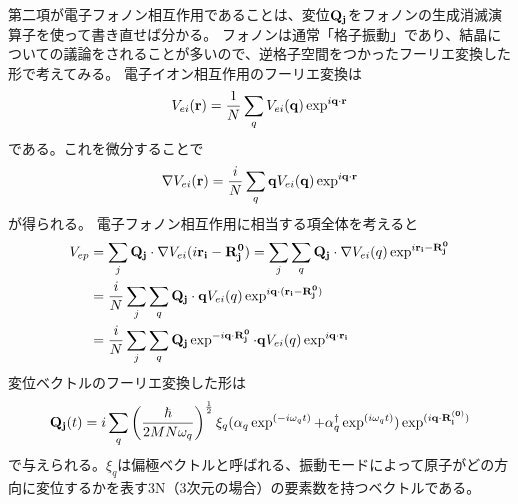 \documentclass[letterpaper,10pt,dvipdfmx]{sphinxhowto}
\begin{document}
第二項が電子フォノン相互作用であることは、変位\(\bf{Q_j}\)をフォノンの生成消滅演算子を使って書き直せば分かる。
フォノンは通常「格子振動」であり、結晶についての議論をされることが多いので、逆格子空間をつかったフーリエ変換した形で考えてみる。
電子イオン相互作用のフーリエ変換は
\begin{equation*}
\begin{split}\begin{aligned}
V_{ei} ({\bf r}) = \frac{1}{N} \sum_{q} V_{ei}({\bf q})\exp^{i{\bf q\cdot r}}\end{aligned}\end{split}
\end{equation*}
である。これを微分することで
\begin{equation*}
\begin{split}\begin{aligned}
\nabla V_{ei} ({\bf r}) = \frac{i}{N} \sum_{q} {\bf q} V_{ei}({\bf
q})\exp^{i{\bf q\cdot r}}\end{aligned}\end{split}
\end{equation*}
が得られる。 電子フォノン相互作用に相当する項全体を考えると
\begin{equation*}
\begin{split}\begin{aligned}
V_{ep}&=\sum_j  {\bf Q_j}\cdot \nabla V_{ei}(i{\bf r_i} - {\bf
R_j^{0}})=\sum_j \sum_q {\bf Q_j}\cdot \nabla V_{ei}(q) \exp^{i{\bf r_i} - {\bf
R_j^{0}}} \nonumber \\
&=\frac{i}{N} \sum_j \sum_q
{\bf Q_j}\cdot  {\bf q}V_{ei}(q) \exp^{i{\bf q} \cdot ({\bf r_i} - {\bf R_j^{0}})}
\nonumber
\\
&= \frac{i}{N} \sum_j \sum_q {\bf Q_j} \exp^{-i{\bf q} \cdot {\bf
R_j^{0}}}\cdot  {\bf q}V_{ei}(q) \exp^{i {\bf q} \cdot{\bf r_i}}\end{aligned}\end{split}
\end{equation*}
変位ベクトルのフーリエ変換した形は
\begin{equation*}
\begin{split}\begin{aligned}
{\bf Q_j}(t)=i\sum_q \left(\frac{\hbar}{2MN\omega_q} \right)^\frac{1}{2} \xi_q
(\alpha_q \exp^{(-i\omega_q t)}+\alpha_q^\dagger \exp^{(i\omega_q t)})
\exp^{(i{\bf q\cdot R_i^{(0)}})}\end{aligned}\end{split}
\end{equation*}
で与えられる。\(\xi_q\)は偏極ベクトルと呼ばれる、振動モードによって原子がどの方向に変位するかを表す3N（3次元の場合）の要素数を持つベクトルである。
\end{document}
